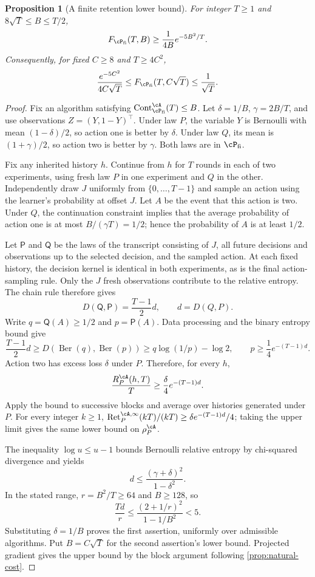 \documentclass[11pt,twoside]{article}
\newcommand{\KL}{D}
\newtheorem{proposition}[theorem]{Proposition}
\theoremstyle{definition}
\theoremstyle{remark}
\DeclareMathOperator{\Cont}{Cont}
\DeclareMathOperator{\Ret}{Ret}
\begin{document}
\begin{proposition}[A finite retention lower bound]
\label{prop:finite-retention}
For integer $T\ge1$ and $8\sqrt T\le B\le T/2$,
\[
 F_{\cP_{\rm fi}}(T,B)\ge\frac{1}{4B}e^{-5B^2/T}.
\]
Consequently, for fixed $C\ge8$ and $T\ge4C^2$,
\[
 \frac{e^{-5C^2}}{4C\sqrt T}
 \le F_{\cP_{\rm fi}}(T,C\sqrt T)\le\frac1{\sqrt T}.
\]
\end{proposition}
\begin{proof}
Fix an algorithm satisfying $\Cont_{\cP_{\rm fi}}^\cA(T)\le B$.
Let $\delta=1/B$, $\gamma=2B/T$, and use observations
$Z=(Y,1-Y)^\top$. Under law $P$, the variable $Y$ is Bernoulli with
mean $(1-\delta)/2$, so action one is better by $\delta$.
Under law $Q$, its mean is $(1+\gamma)/2$, so action two is better by
$\gamma$. Both laws are in $\cP_{\rm fi}$.

Fix any inherited history $h$. Continue from $h$ for $T$ rounds in each
of two experiments, using fresh law $P$ in one experiment and
$Q$ in the other. Independently draw $J$ uniformly from
$\{0,\ldots,T-1\}$ and sample an action using the learner's probability
at offset $J$. Let $A$ be the event that this action is two.
Under $Q$, the continuation constraint implies that the average
probability of action one is at most $B/(\gamma T)=1/2$; hence the
probability of $A$ is at least $1/2$.

Let $\mathsf P$ and $\mathsf Q$ be the laws of the transcript consisting
of $J$, all future decisions and observations up to the selected decision,
and the sampled action. At each fixed history, the decision kernel is
identical in both experiments, as is the final action-sampling rule.
Only the $J$ fresh observations contribute to the relative entropy.
The chain rule therefore gives
\[
 \KL(\mathsf Q,\mathsf P)=\frac{T-1}{2}d,\qquad d=\KL(Q,P).
\]
Write $q=\mathsf Q(A)\ge1/2$ and $p=\mathsf P(A)$.
Data processing and the binary entropy bound give
\[
 \frac{T-1}{2}d
 \ge \KL(\operatorname{Ber}(q),\operatorname{Ber}(p))
 \ge q\log(1/p)-\log2,
 \qquad p\ge\frac14e^{-(T-1)d}.
\]
Action two has excess loss $\delta$ under $P$. Therefore, for every $h$,
\[
 \frac{R_P^\cA(h,T)}{T}\ge\frac\delta4 e^{-(T-1)d}.
\]
Apply the bound to successive blocks and average over histories generated
under $P$. For every integer $k\ge1$,
$\Ret_P^{\cA,\infty}(kT)/(kT)\ge\delta e^{-(T-1)d}/4$;
taking the upper limit gives the same lower bound on $\rho_P^\cA$.

The inequality $\log u\le u-1$ bounds Bernoulli relative entropy by
chi-squared divergence and yields
\[
 d\le\frac{(\gamma+\delta)^2}{1-\delta^2}.
\]
In the stated range, $r=B^2/T\ge64$ and $B\ge128$, so
\[
 \frac{Td}{r}\le\frac{(2+1/r)^2}{1-1/B^2}<5.
\]
Substituting $\delta=1/B$ proves the first assertion, uniformly over
admissible algorithms. Put $B=C\sqrt T$ for the second assertion's
lower bound. Projected gradient gives the upper bound by the block
argument following \cref{prop:natural-cost}.
\end{proof}
\end{document}
